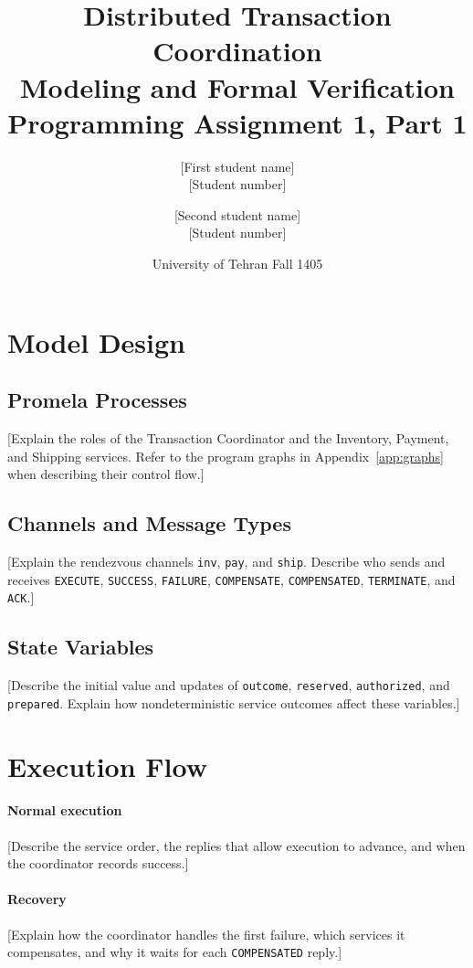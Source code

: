 \documentclass[11pt,a4paper]{article}
\title{\textbf{Distributed Transaction Coordination}\\[3pt]
  \large Modeling and Formal Verification\\
  \normalsize Programming Assignment 1, Part 1}
\author{[First student name] \\ {[Student number]}
  \and [Second student name] \\ {[Student number]}}
\date{University of Tehran \enspace\textbullet\enspace Fall 1405}
\begin{document}
\maketitle

\section{Model Design}
\label{sec:model}

\subsection{Promela Processes}
[Explain the roles of the Transaction Coordinator and the Inventory,
Payment, and Shipping services. Refer to the program graphs in
Appendix~\ref{app:graphs} when describing their control flow.]

\subsection{Channels and Message Types}
[Explain the rendezvous channels \texttt{inv}, \texttt{pay}, and
\texttt{ship}. Describe who sends and receives \texttt{EXECUTE},
\texttt{SUCCESS}, \texttt{FAILURE}, \texttt{COMPENSATE},
\texttt{COMPENSATED}, \texttt{TERMINATE}, and \texttt{ACK}.]

\subsection{State Variables}
[Describe the initial value and updates of \texttt{outcome},
\texttt{reserved}, \texttt{authorized}, and \texttt{prepared}.
Explain how nondeterministic service outcomes affect these variables.]

\section{Execution Flow}
\label{sec:flow}

\paragraph{Normal execution}
[Describe the service order, the replies that allow execution to
advance, and when the coordinator records success.]

\paragraph{Recovery}
[Explain how the coordinator handles the first failure, which services
it compensates, and why it waits for each \texttt{COMPENSATED} reply.]
\end{document}

